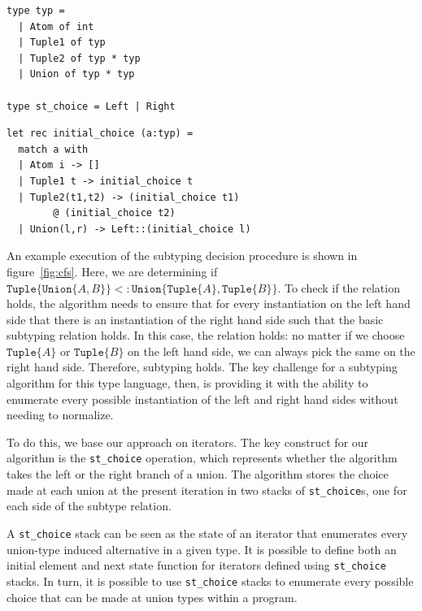\documentclass[a4paper,english]{lipics-v2018}
\newcommand{\xt}[1]{\texttt{#1}}
\newcommand{\union}[2]{\xt{Union\{}#1,#2\xt{\}}}
\newcommand{\tuple}[1]{\xt{Tuple\{}#1\xt{\}}}
\begin{document}
\begin{minipage}{\textwidth}
\begin{minipage}{0.4\textwidth}
\begin{verbatim}
type typ =
  | Atom of int
  | Tuple1 of typ
  | Tuple2 of typ * typ
  | Union of typ * typ

type st_choice = Left | Right
\end{verbatim}
\end{minipage}
\begin{minipage}{0.5\textwidth}
\begin{verbatim}
let rec initial_choice (a:typ) =
  match a with
  | Atom i -> []
  | Tuple1 t -> initial_choice t
  | Tuple2(t1,t2) -> (initial_choice t1) 
  		@ (initial_choice t2)
  | Union(l,r) -> Left::(initial_choice l)
\end{verbatim}
\end{minipage}
\end{minipage}
\hspace{1em}

\noindent An example execution of the subtyping decision procedure is shown in
figure~\ref{fig:cfs}. Here, we are determining if $\tuple{\union{A}{B}} <:
\union{\tuple{A}}{\tuple{B}}$. To check if the relation holds, the algorithm
needs to ensure that for every instantiation on the left hand side that there
is an instantiation of the right hand side such that the basic subtyping
relation holds. In this case, the relation holds: no matter if we choose 
$\tuple{A}$ or $\tuple{B}$ on the left hand side, we can always pick the
same on the right hand side. Therefore, subtyping holds. The key challenge for
a subtyping algorithm for this type language, then, is providing it with the ability
to enumerate every possible instantiation of the left and right hand sides without
needing to normalize.

To do this, we base our approach on iterators. The key construct for our
algorithm is the \verb|st_choice| operation, which represents whether the
algorithm takes the left or the right branch of a union. The algorithm stores
the choice made at each union at the present iteration in two stacks of
\verb|st_choice|s, one for each side of the subtype relation.

A \verb|st_choice| stack can be seen as the state of an iterator that
enumerates every union-type induced alternative in a given type. It is
possible to define both an initial element and next state function for
iterators defined using \verb|st_choice| stacks. In turn, it is possible
to use \verb|st_choice| stacks to enumerate every possible choice that can
be made at union types within a program.
\end{document}

